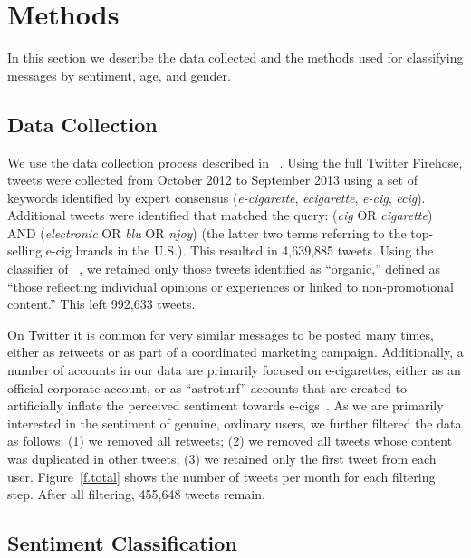 \documentclass{sig-alternate}
\newcommand{\citenoun}[1]{{\citeauthor{#1}~\cite{#1}}}
\begin{document}
\section{Methods}
\label{s.methods}

In this section we describe the data collected and the methods used for classifying messages by sentiment, age, and gender.


\subsection{Data Collection}
\label{sec:data}
We use the data collection process described in
\citenoun{huang2014cross}. Using the full Twitter Firehose, tweets were
collected from October 2012 to September 2013 using a set of keywords
identified by expert consensus ({\it e-cigarette}, {\it ecigarette}, {\it
  e-cig}, {\it ecig}). Additional tweets were identified that matched the
query: ({\it cig} OR {\it cigarette}) AND ({\it electronic} OR {\it blu} OR
{\it njoy}) (the latter two terms referring to the top-selling e-cig brands in
the U.S.). This resulted in 4,639,885 tweets. Using the classifier of
\citenoun{huang2014cross}, we retained only those tweets identified as
``organic,'' defined as ``those reflecting individual opinions or experiences
or linked to non-promotional content.'' This left 992,633 tweets.

On Twitter it is common for very similar messages to be posted many times,
either as retweets or as part of a coordinated marketing
campaign. Additionally, a number of accounts in our data are primarily focused
on e-cigarettes, either as an official corporate account, or as ``astroturf'' accounts that are created to artificially inflate the perceived
sentiment towards e-cigs~\cite{ratkiewicz2011truthy}.  As we are primarily
interested in the sentiment of genuine, ordinary users, we further filtered
the data as follows: (1) we removed all retweets; (2) we removed all tweets
whose content was duplicated in other tweets; (3) we retained only the first
tweet from each user. Figure~\ref{f.total} shows the number of tweets per
month for each filtering step. After all filtering, 455,648 tweets remain.


\subsection{Sentiment Classification}
\end{document}

